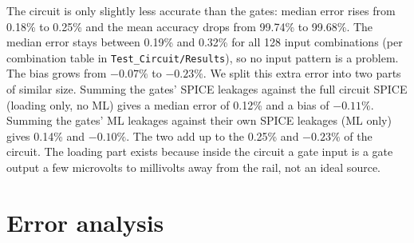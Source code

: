 \documentclass[10pt,a4paper]{article}
\begin{document}
The circuit is only slightly less accurate than the gates: median error rises from 0.18\% to 0.25\% and the mean accuracy drops from 99.74\% to 99.68\%. The median error stays between 0.19\% and 0.32\% for all 128 input combinations (per combination table in \texttt{Test\_Circuit/Results}), so no input pattern is a problem. The bias grows from $-0.07\%$ to $-0.23\%$. We split this extra error into two parts of similar size. Summing the gates' SPICE leakages against the full circuit SPICE (loading only, no ML) gives a median error of 0.12\% and a bias of $-0.11\%$. Summing the gates' ML leakages against their own SPICE leakages (ML only) gives 0.14\% and $-0.10\%$. The two add up to the 0.25\% and $-0.23\%$ of the circuit. The loading part exists because inside the circuit a gate input is a gate output a few microvolts to millivolts away from the rail, not an ideal source.

\section{Error analysis}
\end{document}
